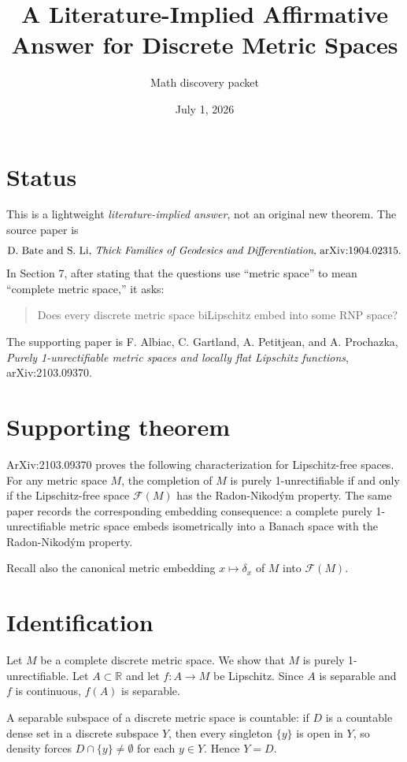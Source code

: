 \documentclass[11pt]{article}
\title{A Literature-Implied Affirmative Answer for Discrete Metric Spaces}
\author{Math discovery packet}
\date{July 1, 2026}
\newcommand{\R}{\mathbb{R}}
\newcommand{\Free}{\mathcal{F}}
\begin{document}
\maketitle

\section{Status}

This is a lightweight \emph{literature-implied answer}, not an original
new theorem.  The source paper is
\[
\text{D. Bate and S. Li, \emph{Thick Families of Geodesics and Differentiation},
arXiv:1904.02315.}
\]
In Section 7, after stating that the questions use ``metric space'' to mean
``complete metric space,'' it asks:
\begin{quote}
Does every discrete metric space biLipschitz embed into some RNP space?
\end{quote}

The supporting paper is F. Albiac, C. Gartland, A. Petitjean, and
A. Prochazka, \emph{Purely 1-unrectifiable metric spaces and locally flat
Lipschitz functions}, arXiv:2103.09370.

\section{Supporting theorem}

ArXiv:2103.09370 proves the following characterization for Lipschitz-free
spaces.  For any metric space \(M\), the completion of \(M\) is purely
1-unrectifiable if and only if the Lipschitz-free space \(\Free(M)\) has the
Radon-Nikod\'ym property.  The same paper records the corresponding embedding
consequence: a complete purely 1-unrectifiable metric space embeds
isometrically into a Banach space with the Radon-Nikod\'ym property.

Recall also the canonical metric embedding \(x\mapsto \delta_x\) of \(M\) into
\(\Free(M)\).

\section{Identification}

Let \(M\) be a complete discrete metric space.  We show that \(M\) is purely
1-unrectifiable.  Let \(A\subset \R\) and let \(f:A\to M\) be Lipschitz.  Since
\(A\) is separable and \(f\) is continuous, \(f(A)\) is separable.

A separable subspace of a discrete metric space is countable: if \(D\) is a
countable dense set in a discrete subspace \(Y\), then every singleton
\(\{y\}\) is open in \(Y\), so density forces \(D\cap\{y\}\ne\emptyset\) for
each \(y\in Y\).  Hence \(Y=D\).
\end{document}
